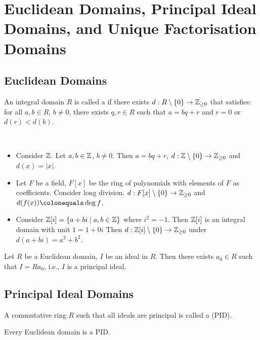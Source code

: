\pagebreak

\section{Euclidean Domains, Principal Ideal Domains, and Unique Factorisation Domains}
\subsection{Euclidean Domains}
\begin{definition}
An integral domain $R$ is called a  if there exists $d:R\setminus\{0\}\to\mathbb Z_{\ge0}$ that satisfies: for all $a,b\in R$, $b\neq0$, there exists $q,r\in R$ such that $a=bq+r$ and $r=0$ or $d(r)<d(b)$.
\end{definition}

\begin{example} \
\begin{itemize}
\item Consider $\mathbb Z$. Let $a,b\in\mathbb Z$, $b\neq0$. Then $a=bq+r$, $d:\mathbb Z\setminus\{0\}\to\mathbb Z_{\ge0}$ and $d(x)=|x|$.
\item Let $F$ be a field, $F[x]$ be the ring of polynomials with elements of $F$ as coefficients. Consider long division. $d:F[x]\setminus\{0\}\to\mathbb Z_{\ge0}$ and $d(f(x))\colonequals\deg f$.
\item Consider $\mathbb Z[i]=\{a+bi\mid a,b\in\mathbb Z\}$ where $i^2=-1$. Then $\mathbb Z[i]$ is an integral domain with unit $1=1+0i$ Then $d:\mathbb Z[i]\setminus\{0\}\to\mathbb Z_{\ge0}$ under $d(a+bi)=a^2+b^2$.
\end{itemize}
\end{example}

\begin{theorem}
Let $R$ be a Euclidean domain, $I$ be an ideal in $R$. Then there exists $a_0\in R$ such that $I=Ra_0$, i.e., $I$ is a principal ideal.
\end{theorem}

\subsection{Principal Ideal Domains}
\begin{definition}
A commutative ring $R$ such that all ideals are principal is called a  (PID).
\end{definition}

\begin{proposition}
Every Euclidean domain is a PID.
\end{proposition}

